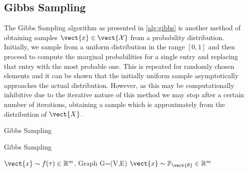 \subsection{Gibbs Sampling}
The Gibbs Sampling algorithm as presented in \alg\ref{alg:gibbs} is another method of obtaining samples $\vect{x} \in \vect{\mathcal{X}}$ from a probability distribution. 
Initially, we sample from a uniform distribution in the range $[0,1]$ and then proceed to compute the marginal probabilities for a single entry and replacing that entry with the most probable one.
This is repeated for randomly chosen elements and it can be shown that the initially uniform sample asymptotically approaches the actual distribution.
However, as this may be computationally inhibitive due to the iterative nature of this method we may stop after a certain number of iterations, obtaining a sample which is approximately from the distribution of $\vect{X}$.

\begin{algo}{Gibbs Sampling~\cite{yildirim2012bayesian}}
    \begin{algorithm}[H]
        \caption{Gibbs Sampling}
        \begin{algorithmic}[1]
            \label{alg:gibbs}
            \REQUIRE $\vect{x} \sim f(\tau) \in \mathbb{R}^m$, Graph G=(V,E)
            \ENSURE  $\vect{x} \sim \mathbb{P}_{\vect{\theta}}\in \mathbb{R}^m$ \\
                \ENDFOR
            \ENDFOR
        \end{algorithmic}
    \end{algorithm}
\end{algo}
